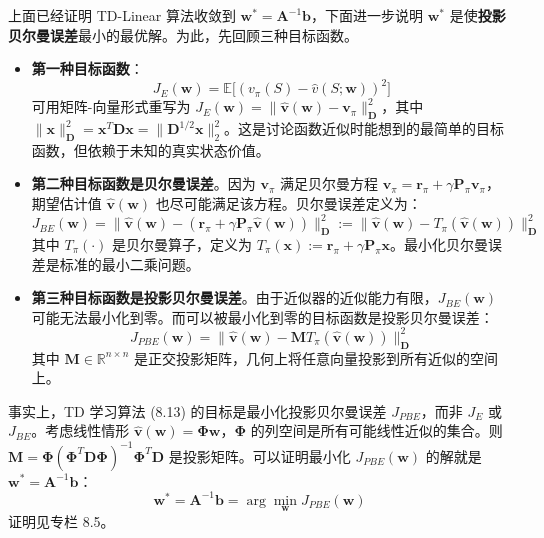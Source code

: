 \documentclass[UTF8]{article}
\begin{document}
上面已经证明 TD-Linear 算法收敛到 $\boldsymbol{w}^* = \boldsymbol{A}^{-1}\boldsymbol{b}$，下面进一步说明 $\boldsymbol{w}^*$ 是使\textbf{投影贝尔曼误差}最小的最优解。为此，先回顾三种目标函数。

\begin{itemize}
    \item \textbf{第一种目标函数}：
    \[
    J_E(\boldsymbol{w}) = \mathbb{E}\big[(v_\pi(S) - \hat{v}(S; \boldsymbol{w}))^2\big]
    \]
    可用矩阵-向量形式重写为 $J_E(\boldsymbol{w}) = \|\hat{\boldsymbol{v}}(\boldsymbol{w}) - \boldsymbol{v}_\pi\|_{\boldsymbol{D}}^2$，其中 $\|\boldsymbol{x}\|_{\boldsymbol{D}}^2 = \boldsymbol{x}^T\boldsymbol{D}\boldsymbol{x} = \|\boldsymbol{D}^{1/2}\boldsymbol{x}\|_2^2$。这是讨论函数近似时能想到的最简单的目标函数，但依赖于未知的真实状态价值。
    
    \item \textbf{第二种目标函数是贝尔曼误差}。因为 $\boldsymbol{v}_\pi$ 满足贝尔曼方程 $\boldsymbol{v}_\pi = \boldsymbol{r}_\pi + \gamma \boldsymbol{P}_\pi \boldsymbol{v}_\pi$，期望估计值 $\hat{\boldsymbol{v}}(\boldsymbol{w})$ 也尽可能满足该方程。贝尔曼误差定义为：
    \[
    J_{BE}(\boldsymbol{w}) = \|\hat{\boldsymbol{v}}(\boldsymbol{w}) - (\boldsymbol{r}_\pi + \gamma \boldsymbol{P}_\pi \hat{\boldsymbol{v}}(\boldsymbol{w}))\|_{\boldsymbol{D}}^2
    := \|\hat{\boldsymbol{v}}(\boldsymbol{w}) - T_\pi(\hat{\boldsymbol{v}}(\boldsymbol{w}))\|_{\boldsymbol{D}}^2
    \]
    其中 $T_\pi(\cdot)$ 是贝尔曼算子，定义为 $T_\pi(\boldsymbol{x}) := \boldsymbol{r}_\pi + \gamma \boldsymbol{P}_\pi \boldsymbol{x}$。最小化贝尔曼误差是标准的最小二乘问题。
    
    \item \textbf{第三种目标函数是投影贝尔曼误差}。由于近似器的近似能力有限，$J_{BE}(\boldsymbol{w})$ 可能无法最小化到零。而可以被最小化到零的目标函数是投影贝尔曼误差：
    \[
    J_{PBE}(\boldsymbol{w}) = \|\hat{\boldsymbol{v}}(\boldsymbol{w}) - \boldsymbol{M} T_\pi(\hat{\boldsymbol{v}}(\boldsymbol{w}))\|_{\boldsymbol{D}}^2
    \]
    其中 $\boldsymbol{M} \in \mathbb{R}^{n \times n}$ 是正交投影矩阵，几何上将任意向量投影到所有近似的空间上。
\end{itemize}

事实上，TD 学习算法 (8.13) 的目标是最小化投影贝尔曼误差 $J_{PBE}$，而非 $J_E$ 或 $J_{BE}$。考虑线性情形 $\hat{\boldsymbol{v}}(\boldsymbol{w}) = \boldsymbol{\Phi}\boldsymbol{w}$，$\boldsymbol{\Phi}$ 的列空间是所有可能线性近似的集合。则 $\boldsymbol{M} = \boldsymbol{\Phi}(\boldsymbol{\Phi}^T\boldsymbol{D}\boldsymbol{\Phi})^{-1}\boldsymbol{\Phi}^T\boldsymbol{D}$ 是投影矩阵。可以证明最小化 $J_{PBE}(\boldsymbol{w})$ 的解就是 $\boldsymbol{w}^* = \boldsymbol{A}^{-1}\boldsymbol{b}$：
\[
\boldsymbol{w}^* = \boldsymbol{A}^{-1}\boldsymbol{b} = \arg\min_{\boldsymbol{w}} J_{PBE}(\boldsymbol{w})
\]
证明见专栏 8.5。
\end{document}
